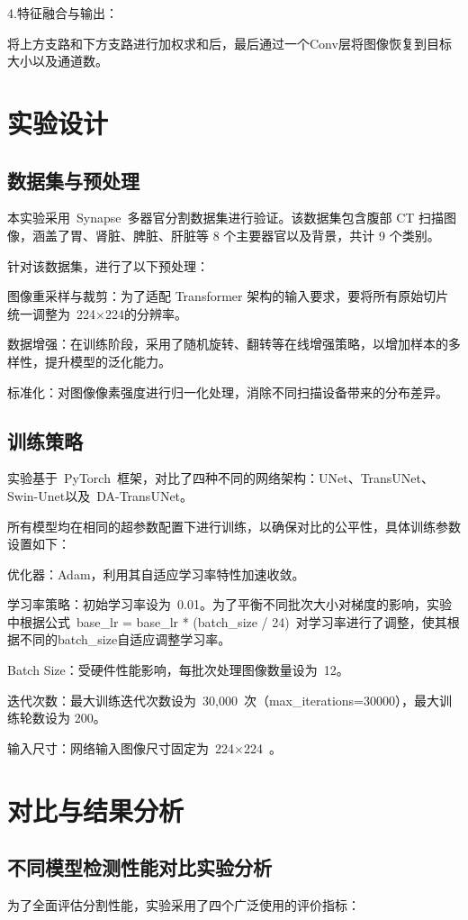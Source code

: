 \documentclass{xduugthesis}
\begin{document}
4.特征融合与输出：

将上方支路和下方支路进行加权求和后，最后通过一个Conv层将图像恢复到目标大小以及通道数。

\section{实验设计}
\subsection{数据集与预处理}
本实验采用 Synapse 多器官分割数据集进行验证。该数据集包含腹部 CT 扫描图像，涵盖了胃、肾脏、脾脏、肝脏等 8 个主要器官以及背景，共计 9 个类别。

针对该数据集，进行了以下预处理：

图像重采样与裁剪：为了适配 Transformer 架构的输入要求，要将所有原始切片统一调整为 224×224的分辨率。

数据增强：在训练阶段，采用了随机旋转、翻转等在线增强策略，以增加样本的多样性，提升模型的泛化能力。

标准化：对图像像素强度进行归一化处理，消除不同扫描设备带来的分布差异。

\subsection{训练策略}

实验基于 PyTorch 框架，对比了四种不同的网络架构：UNet、TransUNet、Swin-Unet以及 DA-TransUNet。

所有模型均在相同的超参数配置下进行训练，以确保对比的公平性，具体训练参数设置如下：

优化器：Adam，利用其自适应学习率特性加速收敛。

学习率策略：初始学习率设为 0.01。为了平衡不同批次大小对梯度的影响，实验中根据公式 base\_lr = base\_lr * (batch\_size / 24) 对学习率进行了调整，使其根据不同的batch\_size自适应调整学习率。

Batch Size：受硬件性能影响，每批次处理图像数量设为 12。

迭代次数：最大训练迭代次数设为 30,000 次（max\_iterations=30000），最大训练轮数设为 200。

输入尺寸：网络输入图像尺寸固定为 224×224 。

\section{对比与结果分析}
\subsection{不同模型检测性能对比实验分析}
为了全面评估分割性能，实验采用了四个广泛使用的评价指标：
\end{document}
